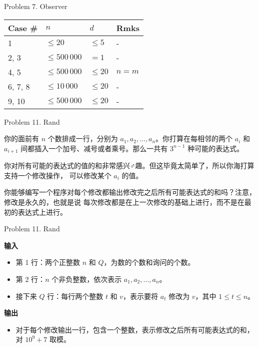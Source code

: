 \documentclass[UTF8]{beamer}
\begin{document}
\begin{frame}{Problem 7. Observer}

\begin{tabularx}{\textwidth}{X|X|X|X} \hline
Case \# & $n$ & $d$ & Rmks \\ \hline \hline
1       & $\leq 20$       & $\leq 5$  & - \\ \hline
2, 3    & $\leq 500\,000$ & $= 1$     & - \\ \hline
4, 5    & $\leq 500\,000$ & $\leq 20$ & $n = m$ \\ \hline
6, 7, 8 & $\leq 10\,000$  & $\leq 20$ & - \\ \hline
9, 10   & $\leq 500\,000$ & $\leq 20$ & - \\ \hline
\end{tabularx}

\end{frame}


\begin{frame}{Problem 11. Rand}

你的面前有 $n$ 个数排成一行，分别为 $a_1, a_2, \dots, a_n$。你打算在每相邻的两个
$a_i$ 和 $a_{i+1}$ 间都插入一个加号、减号或者乘号。那么一共有 $3^{n-1}$ 种可能的表达式。

你对所有可能的表达式的值的和非常感兴♂趣。但这毕竟太简单了，所以你海打算支持一个修改操作，
可以修改某个 $a_i$ 的值。

你能够编写一个程序对每个修改都输出修改完之后所有可能表达式的和吗？注意，修改是永久的，也就是说
每次修改都是在上一次修改的基础上进行，而不是在最初的表达式上进行。

\end{frame}

\begin{frame}{Problem 11. Rand}

\textbf{输入}
\begin{itemize}
    \item 第 1 行：两个正整数 $n$ 和 $Q$，为数的个数和询问的个数。
    \item 第 2 行：$n$ 个非负整数，依次表示 $a_1, a_2, \dots, a_n$。
    \item 接下来 $Q$ 行：每行两个整数 $t$ 和 $v$，表示要将 $a_t$ 修改为 $v$，其中 $1 \leq t \leq n$。
\end{itemize}
\textbf{输出}
\begin{itemize}
    \item 对于每个修改输出一行，包含一个整数，表示修改之后所有可能表达式的和，对 $10^9 + 7$ 取模。
\end{itemize}

\end{frame}
\end{document}
